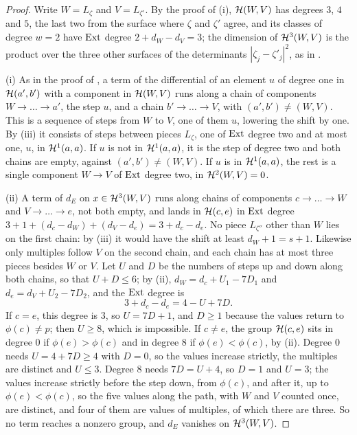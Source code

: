 \begin{proof}
Write $W=L_{\zeta}$ and $V=L_{\zeta'}$. By the proof of
(i), $\mathcal{H}(W,V)$ has degrees $3$, $4$ and $5$, the last
two from the surface where $\zeta$ and $\zeta'$ agree, and its classes of
degree $w=2$ have $\operatorname{Ext}$ degree $2+d_{W}-d_{V}=3$; the dimension of
$\mathcal{H}^{3}(W,V)$ is the product over the three other surfaces of the
determinants $|\zeta_{j}-\zeta'_{j}|^{2}$, as in .

(i) As in the proof of , a term of the differential of an
element $u$ of degree one in $\mathcal{H}(a',b')$ with a component in $\mathcal{H}(W,V)$
runs along a chain of components $W\to\dots\to a'$, the step $u$, and a chain
$b'\to\dots\to V$, with $(a',b')\ne(W,V)$. This is a sequence of steps from
$W$ to $V$, one of them $u$, lowering the shift by one. By
(iii) it consists of steps between pieces $L_{\zeta}$,
one of $\operatorname{Ext}$ degree two and at most one, $u$, in $\mathcal{H}^{1}(a,a)$. If $u$ is
not in $\mathcal{H}^{1}(a,a)$, it is the step of degree two and both chains are
empty, against $(a',b')\ne(W,V)$. If $u$ is in $\mathcal{H}^{1}(a,a)$, the rest is a
single component $W\to V$ of $\operatorname{Ext}$ degree two, in $\mathcal{H}^{2}(W,V)=0$.

(ii) A term of $d_{E}$ on $x\in\mathcal{H}^{3}(W,V)$ runs along chains of components
$c\to\dots\to W$ and $V\to\dots\to e$, not both empty, and lands in $\mathcal{H}(c,e)$
in $\operatorname{Ext}$ degree $3+1+(d_{c}-d_{W})+(d_{V}-d_{e})=3+d_{c}-d_{e}$. No piece
$L_{\zeta''}$ other than $W$ lies on the first chain: by
(iii) it would have the shift at least $d_{W}+1=s+1$.
Likewise only multiples follow $V$ on the second chain, and each chain has at
most three pieces besides $W$ or $V$. Let $U$ and $D$ be the numbers of steps
up and down along both chains, so that $U+D\le6$; by
(ii), $d_{W}=d_{c}+U_{1}-7D_{1}$ and
$d_{e}=d_{V}+U_{2}-7D_{2}$, and the $\operatorname{Ext}$ degree is
\[
  3+d_{c}-d_{e}=4-U+7D .
\]
If $c=e$, this degree is $3$, so $U=7D+1$, and $D\ge1$ because the values
return to $\phi(c)\ne p$; then $U\ge8$, which is impossible. If $c\ne e$, the
group $\mathcal{H}(c,e)$ sits in degree $0$ if $\phi(e)>\phi(c)$ and in degree $8$ if
$\phi(e)<\phi(c)$, by (ii). Degree $0$ needs
$U=4+7D\ge4$ with $D=0$, so the values increase strictly, the multiples are
distinct and $U\le3$. Degree $8$ needs $7D=U+4$, so $D=1$ and $U=3$; the
values increase strictly before the step down, from $\phi(c)$, and after it,
up to $\phi(e)<\phi(c)$, so the five values along the path, with $W$ and $V$
counted once, are distinct, and four of them are values of multiples, of
which there are three. So no term reaches a nonzero group, and $d_{E}$
vanishes on $\mathcal{H}^{3}(W,V)$.


\end{proof}
